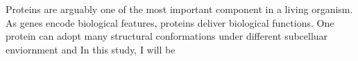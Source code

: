 Proteins are arguably one of the most important component in a living organism. As genes encode biological features, proteins deliver biological functions. One protein can adopt many structural conformations under different subcelluar enviornment and   In this study, I will be 